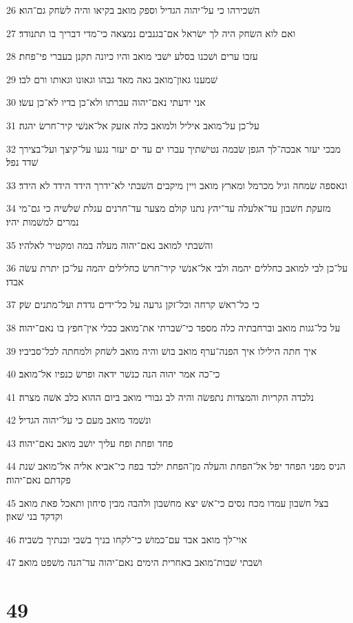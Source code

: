 \par 26 השׁכירהו כי על־יהוה הגדיל וספק מואב בקיאו והיה לשׂחק גם־הוא׃
\par 27 ואם לוא השׂחק היה לך ישׂראל אם־בגנבים נמצאה כי־מדי דבריך בו תתנודד׃
\par 28 עזבו ערים ושׁכנו בסלע ישׁבי מואב והיו כיונה תקנן בעברי פי־פחת׃
\par 29 שׁמענו גאון־מואב גאה מאד גבהו וגאונו וגאותו ורם לבו׃
\par 30 אני ידעתי נאם־יהוה עברתו ולא־כן בדיו לא־כן עשׂו׃
\par 31 על־כן על־מואב איליל ולמואב כלה אזעק אל־אנשׁי קיר־חרשׂ יהגה׃
\par 32 מבכי יעזר אבכה־לך הגפן שׂבמה נטישׁתיך עברו ים עד ים יעזר נגעו על־קיצך ועל־בצירך שׁדד נפל׃
\par 33 ונאספה שׂמחה וגיל מכרמל ומארץ מואב ויין מיקבים השׁבתי לא־ידרך הידד הידד לא הידד׃
\par 34 מזעקת חשׁבון עד־אלעלה עד־יהץ נתנו קולם מצער עד־חרנים עגלת שׁלשׁיה כי גם־מי נמרים למשׁמות יהיו׃
\par 35 והשׁבתי למואב נאם־יהוה מעלה במה ומקטיר לאלהיו׃
\par 36 על־כן לבי למואב כחללים יהמה ולבי אל־אנשׁי קיר־חרשׂ כחלילים יהמה על־כן יתרת עשׂה אבדו׃
\par 37 כי כל־ראשׁ קרחה וכל־זקן גרעה על כל־ידים גדדת ועל־מתנים שׂק׃
\par 38 על כל־גגות מואב וברחבתיה כלה מספד כי־שׁברתי את־מואב ככלי אין־חפץ בו נאם־יהוה׃
\par 39 איך חתה הילילו איך הפנה־ערף מואב בושׁ והיה מואב לשׂחק ולמחתה לכל־סביביו׃
\par 40 כי־כה אמר יהוה הנה כנשׁר ידאה ופרשׂ כנפיו אל־מואב׃
\par 41 נלכדה הקריות והמצדות נתפשׂה והיה לב גבורי מואב ביום ההוא כלב אשׁה מצרה׃
\par 42 ונשׁמד מואב מעם כי על־יהוה הגדיל׃
\par 43 פחד ופחת ופח עליך יושׁב מואב נאם־יהוה׃
\par 44 הניס מפני הפחד יפל אל־הפחת והעלה מן־הפחת ילכד בפח כי־אביא אליה אל־מואב שׁנת פקדתם נאם־יהוה׃
\par 45 בצל חשׁבון עמדו מכח נסים כי־אשׁ יצא מחשׁבון ולהבה מבין סיחון ותאכל פאת מואב וקדקד בני שׁאון׃
\par 46 אוי־לך מואב אבד עם־כמושׁ כי־לקחו בניך בשׁבי ובנתיך בשׁביה׃
\par 47 ושׁבתי שׁבות־מואב באחרית הימים נאם־יהוה עד־הנה משׁפט מואב׃

\chapter{49}

